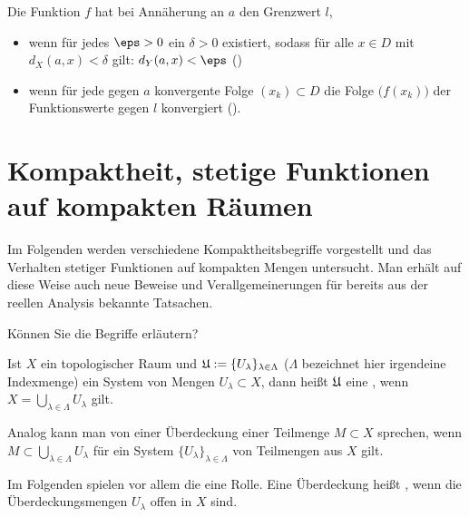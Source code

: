 \begin{antwort}
  Die Funktion $f$ hat bei Annäherung an $a$ den Grenzwert $l$,  
  {\setlength{\labelsep}{4mm}
    \begin{itemize}
    \item[\desc{i}] wenn für jedes $\eps>0$ ein 
      $\delta>0$ existiert, 
      sodass für alle $x\in D$ mit $d_X(a,x)<\delta$ gilt: 
      $d_Y(a,x)< \eps$ () \\[-3.5mm]
    \item[\desc{ii}] wenn für jede gegen $a$ konvergente Folge $(x_k)\subset D$ 
      die Folge $\big( f(x_k) \big)$ der Funktionswerte gegen $l$ konvergiert 
      ().\AntEnd
    \end{itemize}}
\end{antwort}




\section{Kompaktheit, stetige Funktionen auf kompakten Räumen}

Im Folgenden werden verschiedene Kompaktheitsbegriffe 
vorgestellt und das Verhalten stetiger Funktionen auf kompakten 
Mengen untersucht. Man erhält auf diese Weise auch neue 
Beweise und Verallgemeinerungen 
für bereits aus der reellen Analysis bekannte Tatsachen.

\begin{frage}
  Können Sie die Begriffe  erläutern?
\end{frage}

\begin{antwort}
  Ist $X$ ein topologischer Raum und  
  $\frak{U} := \{ U_\lambda \}_{\lambda \in \Lambda}$ 
  ($\Lambda$ bezeichnet hier irgendeine Indexmenge)
  ein System von Mengen $U_\lambda \subset X$, dann heißt 
  $\frak{U}$ eine , wenn 
  $X = \bigcup_{\lambda\in \Lambda} U_\lambda$ gilt. 

  Analog kann man von einer Überdeckung 
  einer Teilmenge $M\subset X$ sprechen, wenn 
  $M \subset \bigcup_{\lambda\in \Lambda} U_\lambda$ 
  für ein System $\{ U_\lambda \}_{\lambda\in \Lambda}$ 
  von Teilmengen aus $X$ gilt.

  Im Folgenden spielen vor allem die  
  eine Rolle. Eine Überdeckung heißt , wenn 
  die Überdeckungsmengen $U_\lambda$ offen in $X$ sind. 
  \AntEnd
\end{antwort} 

